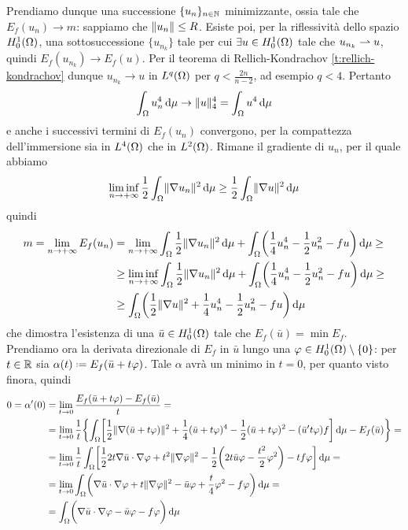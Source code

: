 Prendiamo dunque una successione $\{u_n\}_{n\in\N}$ minimizzante, ossia tale che $E_f(u_n)\to m$: sappiamo che $\norm{u_n}\le R$.
Esiste poi, per la riflessività dello spazio $\sobHc[1]{\Omega}$, una sottosuccessione $\{u_{n_k}\}$ tale per cui $\exists u\in\sobHc[1]{\Omega}$ tale che $u_{n_k}\weakto u$, quindi $E_f(u_{n_k})\to E_f(u)$.
Per il teorema di Rellich-Kondrachov \ref{t:rellich-kondrachov} dunque $u_{n_k}\to u$ in $\leb[q]{\Omega}$ per $q<\frac{2n}{n-2}$, ad esempio $q<4$.
Pertanto
\begin{equation}
    \int_\Omega u_n^4\,\dd\mu\to\norm{u}_4^4=\int_\Omega u^4\,\dd\mu
\end{equation}
e anche i successivi termini di $E_f(u_n)$ convergono, per la compattezza dell'immersione sia in $\leb[4]{\Omega}$ che in $\leb[2]{\Omega}$.
Rimane il gradiente di $u_n$, per il quale abbiamo
\begin{equation}
    \liminf_{n\to+\infty}\frac12\int_\Omega\norm{\grad u_n}^2\,\dd\mu\ge\frac12\int_\Omega\norm{\grad u}^2\,\dd\mu
\end{equation}
quindi
\begin{equation}
    \begin{split}
        m=\lim_{n\to+\infty} E_f(u_n)&=
        \lim_{n\to+\infty}\int_\Omega\frac12\norm{\grad u_n}^2\,\dd\mu+\int_\Omega\biggl(\frac14u_n^4-\frac12u_n^2-fu\biggr)\,\dd\mu\ge\\ &\ge
        \liminf_{n\to+\infty}\int_\Omega\frac12\norm{\grad u_n}^2\,\dd\mu+\int_\Omega\biggl(\frac14u_n^4-\frac12u_n^2-fu\biggr)\,\dd\mu\ge\\ &\ge
        \int_\Omega\biggl(\frac12\norm{\grad u}^2+\frac14u_n^4-\frac12u_n^2-fu\biggr)\,\dd\mu
    \end{split}
\end{equation}
che dimostra l'esistenza di una $\bar{u}\in\sobHc[1]{\Omega}$ tale che $E_f(\bar{u})=\min E_f$.
Prendiamo ora la derivata direzionale di $E_f$ in $\bar{u}$ lungo una $\phi\in\sobHc[1]{\Omega}\setminus\{0\}$: per $t\in\R$ sia $\alpha(t)\defeq E_f(\bar{u}+t\phi)$.
Tale $\alpha$ avrà un minimo in $t=0$, per quanto visto finora, quindi
\begin{equation}
    \begin{split}
        0=\alpha'(0)&=
        \lim_{t\to 0}\frac{E_f(\bar{u}+t\phi)-E_f(\bar{u})}{t}=\\ &=
        \lim_{t\to 0}\frac1{t}\biggl\{\int_\Omega\biggr[\frac12\norm{\grad(\bar{u}+t\phi)}^2+\frac14(\bar{u}+t\phi)^4-\frac12(\bar{u}+t\phi)^2-(\bar{u}'t\phi)f\biggr]\,\dd\mu-E_f(\bar{u})\biggr\}=\\ &=
        \lim_{t\to 0}\frac1{t}\int_\Omega\biggr[\frac122t\scalar{\grad\bar{u}}{\grad\phi}+t^2\norm{\grad\phi}^2-\frac12\biggl(2t\bar{u}\phi-\frac{t^2}2\phi^2\biggr)-tf\phi\biggr]\,\dd\mu=\\ &=
        \lim_{t\to 0}\int_\Omega\biggr(\scalar{\grad\bar{u}}{\grad\phi}+t\norm{\grad\phi}^2-\bar{u}\phi+\frac{t}4\phi^2-f\phi\biggr)\,\dd\mu=\\ &=
        \int_\Omega\biggr(\scalar{\grad\bar{u}}{\grad\phi}-\bar{u}\phi-f\phi\biggr)\,\dd\mu
    \end{split}
\end{equation}
